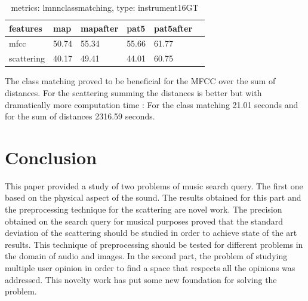 \documentclass[hidelinks,12pt]{report}
\begin{document}
\begin{enumerate}
\begin{table}[H]
\begin{center}
\begin{tabular}{ | l | l | l | l | l | l |}
features & map & mapafter & pat5 & pat5after\\ 
\hline 
mfcc & 50.74 & 55.34 & 55.66 & 61.77 \\ 
scattering & 40.17 & 49.41 & 44.01 & 60.75  \\  
\end{tabular} 
\end{center} 
\caption{metrics: lmnnclassmatching, type: instrument16GT} 
\label{you} 
\end{table}  
The class matching proved to be beneficial for the MFCC over the sum of distances. For the scattering summing the distances is better but with dramatically more computation time : For the class matching 21.01 seconds and for the sum of distances 2316.59 seconds.  
\end{enumerate}

\section{Conclusion}
This paper provided a study of two problems of music search query. The first one based on the physical aspect of the sound. The results obtained for this part and the preprocessing technique for the scattering are novel work. The precision obtained on the search query for musical purposes proved that the standard deviation of the scattering should be studied in order to achieve state of the art results. This technique of preprocessing should be tested for different problems in the domain of audio and images.
In the second part, the problem of studying multiple user opinion in order to find a space that respects all the opinions was addressed. This novelty work has put some new foundation for solving the problem.
\newpage
\end{document}
